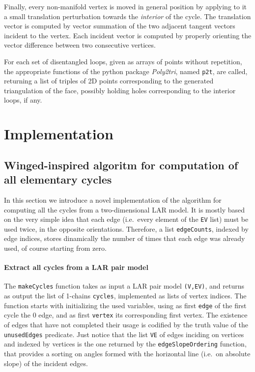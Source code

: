 \documentclass[11pt,oneside]{article}    %
\begin{document}
Finally, every non-manifold vertex is moved in general position by applying to it a small translation perturbation towards the \emph{interior} of the cycle. The translation vector is computed by vector summation of the two adjacent tangent vectors incident to the vertex. Each incident vector is computed by properly orienting the vector difference between two consecutive vertices. 

For each set of disentangled loops, given as arrays of points without repetition, the appropriate functions of the python package \emph{Poly2tri}, named \texttt{p2t}, are called, returning a list of triples of 2D points corresponding to the generated triangulation of the face, possibly holding holes corresponding to the interior loops, if any.





\section{Implementation}


\subsection{Winged-inspired algoritm for computation of all elementary cycles}

In this section we introduce a novel implementation of the algorithm for computing all the cycles  from a two-dimensional LAR model. It is mostly based on the very simple idea that each edge (i.e.~every element of the \texttt{EV} list) must be used twice, in the opposite orientations. Therefore, a list \texttt{edgeCounts}, indexed by edge indices, stores dinamically the number of times that each edge was already used, of course starting from zero. 
    
\paragraph{Extract all cycles from a LAR pair model}

The \texttt{makeCycles} function takes as input a LAR pair model \texttt{(V,EV)}, and returns as output the list of 1-chains \texttt{cycles}, implemented as lists of vertex indices. The function starts with initializing the used variables, using as first \texttt{edge} of the first cycle the 0 edge, and as first \texttt{vertex} its corresponding first vertex. The existence of edges that have not completed their usage is codified by the truth value of the \texttt{unusedEdges} predicate. Just notice that the list \texttt{VE} of edges inciding on vertices and indexed by vertices is the one returned by the \texttt{edgeSlopeOrdering} function, that provides a sorting on angles formed with the horizontal line (i.e.~on absolute slope) of the incident edges. 
\end{document}

